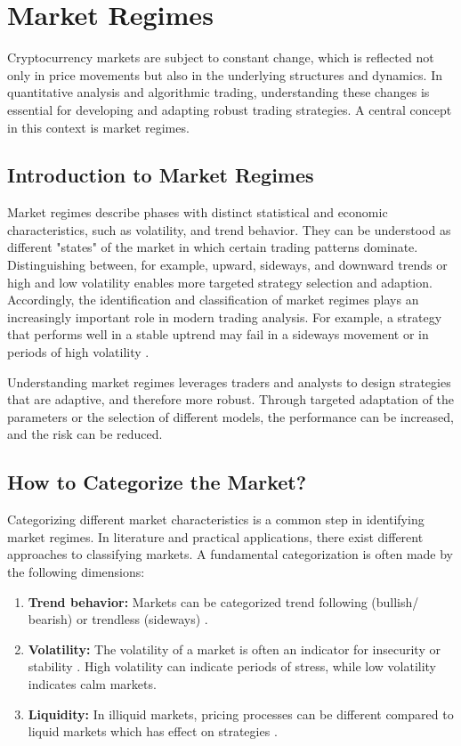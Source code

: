 \section{Market Regimes}

Cryptocurrency markets are subject to constant change, which is reflected not only in price movements but also in the underlying structures and dynamics.
In quantitative analysis and algorithmic trading, understanding these changes is essential for developing and adapting robust trading strategies.
A central concept in this context is market regimes.

\subsection{Introduction to Market Regimes}

Market regimes describe phases with distinct statistical and economic characteristics, such as volatility, and trend behavior.
They can be understood as different "states" of the market in which certain trading patterns dominate.
Distinguishing between, for example, upward, sideways, and downward trends or high and low volatility enables more targeted strategy selection and adaption.
Accordingly, the identification and classification of market regimes plays an increasingly important role in modern trading analysis.
For example, a strategy that performs well in a stable uptrend may fail in a sideways movement or in periods of high volatility \cite{macrosynergy-market-regime-introduction}.

Understanding market regimes leverages traders and analysts to design strategies that are adaptive, and therefore more robust.
Through targeted adaptation of the parameters or the selection of different models, the performance can be increased, and the risk can be reduced.

\subsection{How to Categorize the Market?}
\label{chap:market-regime-categories}

Categorizing different market characteristics is a common step in identifying market regimes.
In literature and practical applications, there exist different approaches to classifying markets.
A fundamental categorization is often made by the following dimensions:

\begin{enumerate}
    \item \textbf{Trend behavior:} Markets can be categorized trend following (bullish/ bearish) or trendless (sideways) \cite{regime-trend}.
    \item \textbf{Volatility:} The volatility of a market is often an indicator for insecurity or stability \cite{regime-vola}.
    High volatility can indicate periods of stress, while low volatility indicates calm markets.
    \item \textbf{Liquidity:} In illiquid markets, pricing processes can be different compared to liquid markets which has effect on strategies \cite{regime-liq}.
\end{enumerate}

